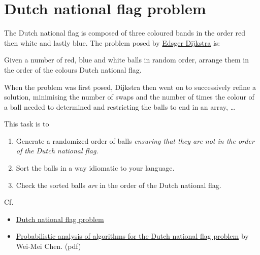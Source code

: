 \pagebreak{}
\section*{Dutch national flag problem}

The Dutch national flag is composed of three coloured bands in the order
red then white and lastly blue. The problem posed by
\href{http://en.wikipedia.org/wiki/Edsger\_Dijkstra}{Edsger Dijkstra}
is:

Given a number of red, blue and white balls in random order, arrange
them in the order of the colours Dutch national flag.

When the problem was first posed, Dijkstra then went on to successively
refine a solution, minimising the number of swaps and the number of
times the colour of a ball needed to determined and restricting the
balls to end in an array, \ldots{}

\begin{description}
\item[This task is to]
\end{description}

\begin{enumerate}
\item
  Generate a randomized order of balls \emph{ensuring that they are not
  in the order of the Dutch national flag}.
\item
  Sort the balls in a way idiomatic to your language.
\item
  Check the sorted balls \emph{are} in the order of the Dutch national
  flag.
\end{enumerate}

Cf.

\begin{itemize}
\item
  \href{http://en.wikipedia.org/wiki/Dutch\_national\_flag\_problem}{Dutch
  national flag problem}
\item
  \href{https://www.google.co.uk/search?rlz=1C1DSGK\_enGB472GB472\&sugexp=chrome,mod=8\&sourceid=chrome\&ie=UTF-8\&q=Dutch+national+flag+problem\#hl=en\&rlz=1C1DSGK\_enGB472GB472\&sclient=psy-ab\&q=Probabilistic+analysis+of+algorithms+for+the+Dutch+national+flag+problem\&oq=Probabilistic+analysis+of+algorithms+for+the+Dutch+national+flag+problem\&gs\_l=serp.3...60754.61818.1.62736.1.1.0.0.0.0.72.72.1.1.0...0.0.Pw3RGungndU\&psj=1\&bav=on.2,or.r\_gc.r\_pw.r\_cp.r\_qf.,cf.osb\&fp=c33d18147f5082cc\&biw=1395\&bih=951}{Probabilistic
  analysis of algorithms for the Dutch national flag problem} by Wei-Mei
  Chen. (pdf)
\end{itemize}


